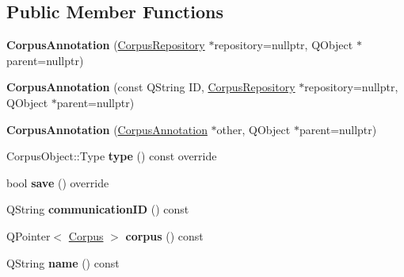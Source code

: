 \subsection*{Public Member Functions}
\begin{DoxyCompactItemize}
\item 
\mbox{\label{class_corpus_annotation_aeaf4554895df52730ab8c6939b070421}} 
{\bfseries Corpus\+Annotation} (\hyperlink{class_corpus_repository}{Corpus\+Repository} $\ast$repository=nullptr, Q\+Object $\ast$parent=nullptr)
\item 
\mbox{\label{class_corpus_annotation_a23014f51ce94c4b90ac04ec2fce29938}} 
{\bfseries Corpus\+Annotation} (const Q\+String ID, \hyperlink{class_corpus_repository}{Corpus\+Repository} $\ast$repository=nullptr, Q\+Object $\ast$parent=nullptr)
\item 
\mbox{\label{class_corpus_annotation_ad79f5199315b78ffa0da1ef06a687a93}} 
{\bfseries Corpus\+Annotation} (\hyperlink{class_corpus_annotation}{Corpus\+Annotation} $\ast$other, Q\+Object $\ast$parent=nullptr)
\item 
\mbox{\label{class_corpus_annotation_adc7b62e91d01e00c9754aa8819841587}} 
Corpus\+Object\+::\+Type {\bfseries type} () const override
\item 
\mbox{\label{class_corpus_annotation_ab6e98b3fc0d449b2e76b32ca25a27102}} 
bool {\bfseries save} () override
\item 
\mbox{\label{class_corpus_annotation_af9a18d51ebb2e4db26bb66a831ea4c57}} 
Q\+String {\bfseries communication\+ID} () const
\item 
\mbox{\label{class_corpus_annotation_a71af0d158027529d821a9fc41ddd888a}} 
Q\+Pointer$<$ \hyperlink{class_corpus}{Corpus} $>$ {\bfseries corpus} () const
\item 
\mbox{\label{class_corpus_annotation_a3d96da8cc79294ad900ea8869ab040b4}} 
Q\+String {\bfseries name} () const
\item 
\mbox{\label{class_corpus_annotation_a3cdc3692368c60cdde4bedcd22db525f}} 

\end{DoxyCompactItemize}
